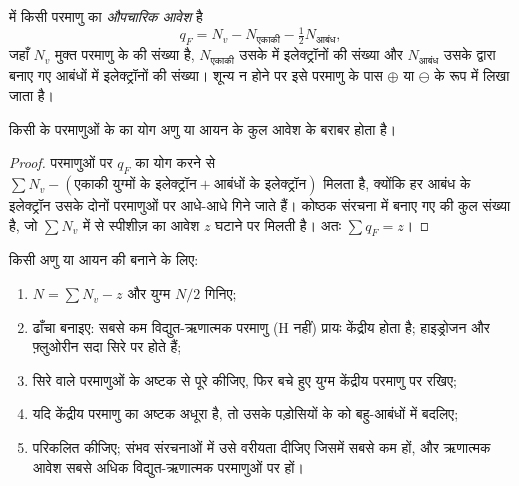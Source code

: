 \begin{definition}[औपचारिक आवेश]\label{def:b1:lewis-resonance-vsepr:formal-charge}
 में किसी परमाणु का \emph{औपचारिक आवेश}
है
\[
  q_F = N_v - N_{\text{एकाकी}} - \tfrac12 N_{\text{आबंध}},
\]
जहाँ $N_v$ मुक्त परमाणु के  की संख्या है,
$N_{\text{एकाकी}}$ उसके  में इलेक्ट्रॉनों की संख्या और
$N_{\text{आबंध}}$ उसके द्वारा बनाए गए आबंधों में इलेक्ट्रॉनों की संख्या। शून्य न होने पर
इसे परमाणु के पास $\oplus$ या $\ominus$ के रूप में लिखा जाता है।
\end{definition}

\begin{proposition}[औपचारिक आवेशों का योग आवेश के बराबर है]\label{prop:b1:lewis-resonance-vsepr:formal-sum}
किसी  के परमाणुओं के  का योग
अणु या आयन के कुल आवेश के बराबर होता है।
\end{proposition}

\begin{proof}
परमाणुओं पर $q_F$ का योग करने से $\sum N_v - (\text{एकाकी
युग्मों के इलेक्ट्रॉन} + \text{आबंधों के इलेक्ट्रॉन})$ मिलता है, क्योंकि हर आबंध के इलेक्ट्रॉन
उसके दोनों परमाणुओं पर आधे-आधे गिने जाते हैं। कोष्ठक संरचना में बनाए गए
 की कुल संख्या है, जो $\sum N_v$ में से
स्पीशीज़ का आवेश $z$ घटाने पर मिलती है। अतः $\sum q_F = z$।
\end{proof}

\begin{method}[लुइस संरचना बनाना]\label{met:b1:lewis-resonance-vsepr:lewis}
किसी अणु या आयन की  बनाने के लिए:
\begin{enumerate}
  \item {} $N = \sum N_v - z$ और युग्म $N/2$ गिनिए;
  \item ढाँचा बनाइए: सबसे कम विद्युत-ऋणात्मक परमाणु (H नहीं) प्रायः
        केंद्रीय होता है; हाइड्रोजन और फ़्लुओरीन सदा सिरे पर होते हैं;
  \item सिरे वाले परमाणुओं के अष्टक  से पूरे कीजिए, फिर
        बचे हुए युग्म केंद्रीय परमाणु पर रखिए;
  \item यदि केंद्रीय परमाणु का अष्टक अधूरा है, तो उसके पड़ोसियों के  को
        बहु-आबंधों में बदलिए;
  \item {} परिकलित कीजिए; संभव संरचनाओं में उसे वरीयता दीजिए
        जिसमें सबसे कम  हों, और ऋणात्मक आवेश
        सबसे अधिक विद्युत-ऋणात्मक परमाणुओं पर हों।
\end{enumerate}
\end{method}

